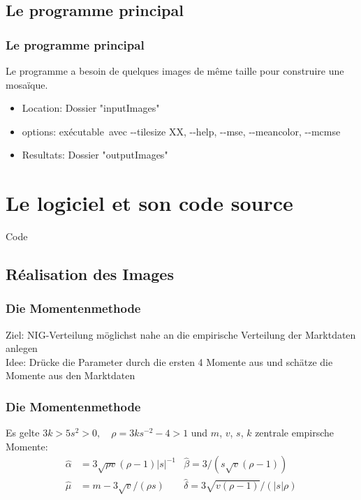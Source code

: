 \documentclass[handout]{beamer}
\newcommand{\tcb}{\color{blue}}
\begin{document}
\subsection{Le programme principal}

\begin{frame}
\frametitle{\bf Le programme principal}
Le programme a besoin de quelques images de m\^eme taille pour construire une mosa\"{i}que.
\begin{itemize}
\item {\tcb Location}: Dossier "inputImages"

\item {\tcb options}: ex\'ecutable\ avec {-}{-}tilesize XX, {-}{-}help, {-}{-}mse, {-}{-}meancolor, {-}{-}mcmse

\item {\tcb Resultats}: Dossier "outputImages"
\end{itemize}

\end{frame}

\section{Le logiciel et son code source}

\begin{frame}
\begin{center}
{\Huge Code}
\end{center}

\end{frame}

\subsection{R\'ealisation des Images}
\begin{frame}

\frametitle{\bf Die Momentenmethode}
{\tcb Ziel:} NIG-Verteilung m\"oglichst nahe an die empirische Verteilung der Marktdaten anlegen\\ \pause
{\tcb Idee:} Dr\"ucke die Parameter durch die ersten 4 Momente aus und sch\"atze die Momente aus den Marktdaten

\end{frame}

\begin{frame}
\frametitle{\bf Die Momentenmethode}
Es gelte $3k>5s^2>0, \quad \rho=3ks^{-2}-4>1$ und $m$, $v$, $s$, $k$ zentrale empirsche Momente:
\begin{align*}
\hat{\alpha}&=3\sqrt{\rho v}(\rho-1)|s|^{-1}  &\hat{\beta}=3/(s\sqrt{v}(\rho-1))\quad\\
\hat{\mu}&=m-3\sqrt{v}/(\rho s)  &\hat{\delta}=3\sqrt{v(\rho-1)}/(|s|\rho)
\end{align*}
\end{frame}
\end{document}
